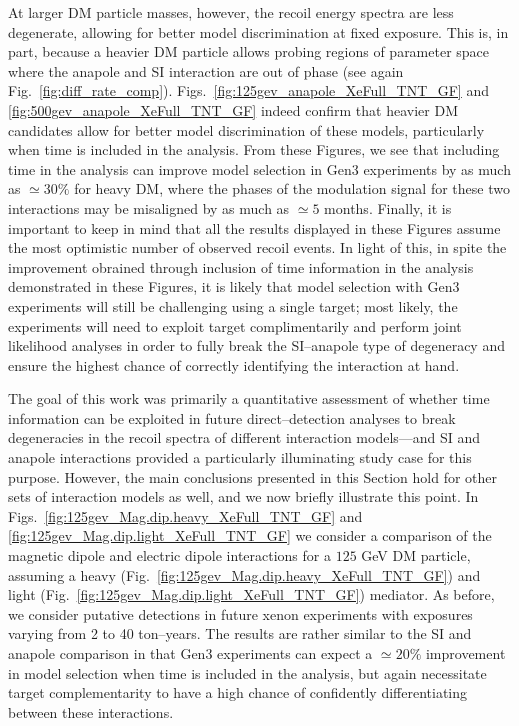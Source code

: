 \documentclass[11pt]{article}
\newcommand{\Fig}[1]{Fig.~\ref{#1}} \newcommand{\Figs}[2]{Figs.~\ref{#1} and \ref{#2}}
\begin{document}
At larger DM particle masses, however, the recoil energy spectra are less degenerate, allowing for better model discrimination at fixed exposure. This is, in part, because a heavier DM particle allows probing regions of parameter space where the anapole and SI interaction are out of phase (see again \Fig{fig:diff_rate_comp}). Figs.~\ref{fig:125gev_anapole_XeFull_TNT_GF} and \ref{fig:500gev_anapole_XeFull_TNT_GF} indeed confirm that heavier DM candidates allow for better model discrimination of these models, particularly when time is included in the analysis. From these Figures, we see that including time in the analysis can improve model selection in Gen3 experiments by as much as $\simeq 30\%$ for heavy DM, where the phases of the modulation signal for these two interactions may be misaligned by as much as $\simeq 5$ months. Finally, it is important to keep in mind that all the results displayed in these Figures assume the most optimistic number of observed recoil events. In light of this, in spite the improvement obrained through inclusion of time information in the analysis demonstrated in these Figures, it is likely that model selection with Gen3 experiments will still be challenging using a single target; most likely, the experiments will need to exploit target complimentarily and perform joint likelihood analyses in order to fully break the SI--anapole type of degeneracy and ensure the highest chance of correctly identifying the interaction at hand. 

The goal of this work was primarily a quantitative assessment of whether time information can be exploited in future direct--detection analyses to break degeneracies in the recoil spectra of different interaction models---and SI and anapole interactions provided a particularly illuminating study case for this purpose. However, the main conclusions presented in this Section hold for other sets of interaction models as well, and we now briefly illustrate this point. In \Figs{fig:125gev_Mag.dip.heavy_XeFull_TNT_GF}{fig:125gev_Mag.dip.light_XeFull_TNT_GF} we consider a comparison of the magnetic dipole and electric dipole interactions for a $125$ GeV DM particle, assuming a heavy (\Fig{fig:125gev_Mag.dip.heavy_XeFull_TNT_GF}) and light (\Fig{fig:125gev_Mag.dip.light_XeFull_TNT_GF}) mediator. As before, we consider putative detections in future xenon experiments with exposures varying from 2 to 40 ton--years. The results are rather similar to the SI and anapole comparison in that Gen3 experiments can expect a $\simeq 20\%$ improvement in model selection when time is included in the analysis, but again necessitate target complementarity to have a high chance of confidently differentiating between these interactions.
\end{document}

